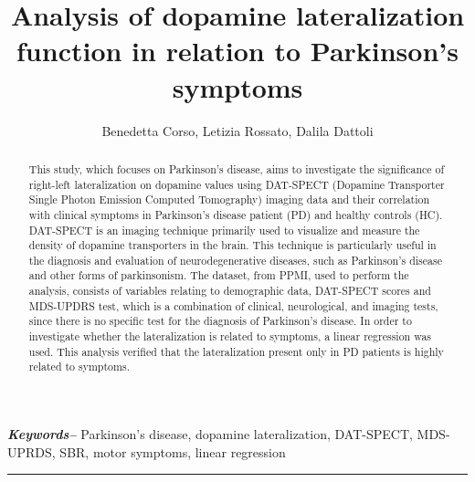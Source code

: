 \documentclass[]{article}
\title{ \textbf{Analysis of dopamine lateralization function in relation to Parkinson's symptoms}}
\author{Benedetta Corso, Letizia Rossato, Dalila Dattoli}
\date{}
\providecommand{\keywords}[1]
{
	\small	
	\textbf{\textit{Keywords--}} #1
}
\begin{document}
\maketitle

\begin{abstract}
This study, which focuses on Parkinson's disease, aims to investigate the significance of right-left lateralization on dopamine values using DAT-SPECT (Dopamine Transporter Single Photon Emission Computed Tomography) imaging data and their correlation with clinical symptoms in Parkinson’s disease patient (PD) and healthy controls (HC). DAT-SPECT is an imaging technique primarily used to visualize and measure the density of dopamine transporters in the brain. This technique is particularly useful in the diagnosis and evaluation of neurodegenerative diseases, such as Parkinson's disease and other forms of parkinsonism. The dataset, from PPMI, used to perform the analysis, consists of variables relating to demographic data, DAT-SPECT scores and MDS-UPDRS test, which is a combination of clinical, neurological, and imaging tests, since there is no specific test for the diagnosis of Parkinson’s disease. In order to investigate whether the lateralization is related to symptoms, a linear regression was used. This analysis verified that the lateralization present only in PD patients is highly related to symptoms.
\newline

\end{abstract}

\keywords{Parkinson's disease, dopamine lateralization, DAT-SPECT, MDS-UPRDS, SBR, motor symptoms, linear regression}


\vspace{5pt}
\hrule
\vspace{6pt}
\end{document}
